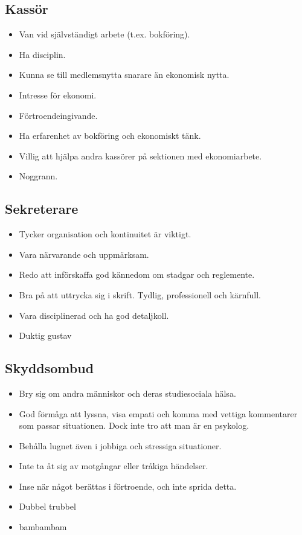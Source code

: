 \documentclass[a4paper]{article}
\begin{document}
\subsection*{Kassör}
\begin{itemize}
\item Van vid självständigt arbete (t.ex. bokföring).
\item Ha disciplin.
\item Kunna se till medlemsnytta snarare än ekonomisk nytta.
\item Intresse för ekonomi.
\item Förtroendeingivande.
\item Ha erfarenhet av bokföring och ekonomiskt tänk.
\item Villig att hjälpa andra kassörer på sektionen med ekonomiarbete.
\item Noggrann.
\end{itemize}

\subsection*{Sekreterare}
\begin{itemize}
\item Tycker organisation och kontinuitet är viktigt.
\item Vara närvarande och uppmärksam.
\item Redo att införskaffa god kännedom om stadgar och reglemente.
\item Bra på att uttrycka sig i skrift. Tydlig, professionell och kärnfull.
\item Vara disciplinerad och ha god detaljkoll.
\item Duktig gustav
\end{itemize}

\subsection*{Skyddsombud}
\begin{itemize}
\item Bry sig om andra människor och deras studiesociala hälsa.
\item God förmåga att lyssna, visa empati och komma med vettiga kommentarer som passar situationen. Dock inte tro att man är en psykolog.
\item Behålla lugnet även i jobbiga och stressiga situationer. 
\item Inte ta åt sig av motgångar eller tråkiga händelser.
\item Inse när något berättas i förtroende, och inte sprida detta. 
\item Dubbel trubbel
\item bambambam
\end{itemize}
        
\end{document}
